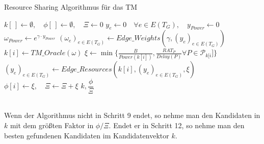 \documentclass[11pt, a4paper, german]{article}
\begin{document}
\LinesNumbered
\begin{algorithm}[H]
\DontPrintSemicolon
\caption{Resource Sharing Algorithmus für das TM}

   $k[\,] \gets \emptyset, \quad \phi[\,] \gets \emptyset, \quad \Xi \gets 0 $\;
  $y_e \gets 0 \quad \forall e \in E(T_G), \quad y_{Power} \gets 0$\;
     {
        $\omega_{Power} \gets e^{\gamma \cdot y_{Power}}$\;
        $(\omega_e)_{e \in E(T_G)} \gets Edge\_Weights(\gamma, (y_e)_{e \in E(T_G)})$\;
        $k[i] \gets TM\_Oracle(\omega)$\;
        $\xi \gets \min \{ \frac{B}{Power(k[i])}, \frac{RAT_P}{Delay(P)} \forall P \in \mathcal{P}_{k[i}] \}$\;
        $(y_e)_{e \in E(T_G)} \gets Edge\_Resources(k[i], (y_e)_{e \in E(T_G)}, \xi)$\;
        $\phi[i] \gets \xi, \quad \Xi \gets \Xi + \xi$
     }
     \Return $k,\dfrac{\phi}{\Xi}$
\end{algorithm}\ \\

Wenn der Algorithmus nicht in Schritt 9 endet, so nehme man den Kandidaten in $k$ mit dem größten Faktor in ${\phi}/{\Xi}$.  Endet er in Schritt 12, so nehme man den besten gefundenen Kandidaten im Kandidatenvektor $k$.
\end{document}
